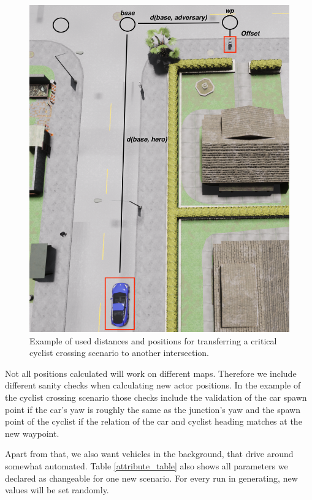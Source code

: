\documentclass[conference, a4paper, 11pt]{IEEEtran}
\begin{document}
\begin{figure}[ht]
	\centering
	\includegraphics[width=\linewidth]{figures/carla_distances.png}
	\caption{Example of used distances and positions for transferring a critical cyclist crossing scenario to another intersection. }
	\label{fig:distances_carla}
\end{figure}

Not all positions calculated will work on different maps. Therefore we include different sanity checks when calculating new actor positions. In the example of the cyclist crossing scenario those checks include the validation of the car spawn point if the car's yaw is roughly the same as the junction's yaw and the spawn point of the cyclist  if the relation of the car and cyclist heading matches at the new waypoint.


Apart from that, we also want vehicles in the background, that drive around somewhat automated.
Table \ref{attribute_table} also shows all parameters we declared as changeable for one new scenario. For every run in generating, new values will be set randomly.
\end{document}
